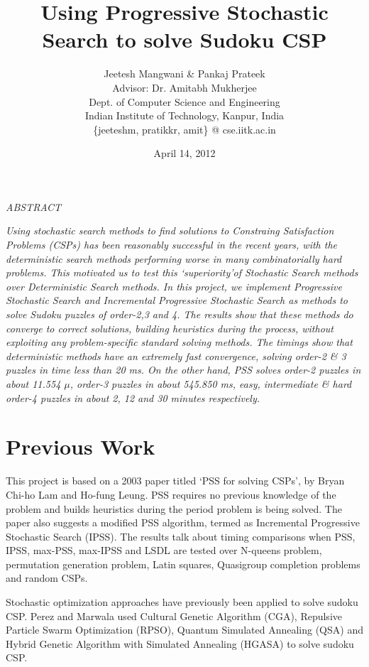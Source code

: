 \documentclass[a4paper]{article}
\title{Using Progressive Stochastic Search to solve Sudoku CSP}
\author{Jeetesh Mangwani \& Pankaj Prateek\\
	Advisor: Dr. Amitabh Mukherjee\cite{instructorWebsite}\cite{courseWebsite}\\
        Dept. of Computer Science and Engineering\\
	Indian Institute of Technology, Kanpur, India\\
	\{jeeteshm, pratikkr, amit\} @ cse.iitk.ac.in}
\date{April 14, 2012}
\begin{document}
\maketitle
\begin{center}{\b \em ABSTRACT}\end{center}
{\em Using stochastic search methods to find solutions to Constraing Satisfaction Problems (CSPs) has been reasonably successful in the recent years, with the deterministic search methods performing worse in many combinatorially hard problems. This motivated us to test this {\lq}superiority\rq of Stochastic Search methods over Deterministic Search methods. In this project, we implement Progressive Stochastic Search and Incremental Progressive Stochastic Search as methods to solve Sudoku puzzles of order-2,3 and 4. The results show that these methods do converge to correct solutions, building heuristics during the process, without exploiting any problem-specific standard solving methods. The timings show that deterministic methods have an extremely fast convergence, solving order-2 \& 3 puzzles in time less than 20 ms. On the other hand, PSS solves order-2 puzzles in about 11.554 $\mu$, order-3 puzzles in about 545.850 ms, easy, intermediate \& hard order-4 puzzles in about 2, 12 and 30 minutes respectively.}

\section{Previous Work}
This project is based on a 2003 paper titled \lq PSS for solving CSPs\rq\cite{mainref}, by Bryan Chi-ho Lam and Ho-fung Leung. PSS requires no previous knowledge of the problem and builds heuristics during the period problem is being solved. The paper also suggests a modified PSS algorithm, termed as Incremental Progressive Stochastic Search (IPSS). The results talk about timing comparisons when PSS, IPSS, max-PSS, max-IPSS and LSDL are tested over N-queens problem, permutation generation problem, Latin squares, Quasigroup completion problems and random CSPs. 

Stochastic optimization approaches have previously been applied to solve sudoku CSP. Perez and Marwala used Cultural Genetic Algorithm (CGA), Repulsive Particle Swarm Optimization (RPSO), Quantum Simulated Annealing (QSA) and Hybrid Genetic Algorithm with Simulated Annealing (HGASA) to solve sudoku CSP\cite{uww}.
\end{document}

